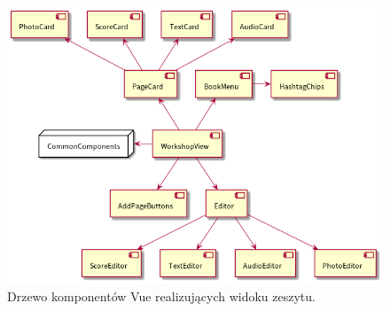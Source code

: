 \begin{figure}[H]
	\begin{center}
		\includegraphics[scale=0.6]{media/WorkshopComponents.png}
	\end{center}
	\caption{Drzewo komponentów Vue realizujących widoku zeszytu.}
	\label{rys:workshop-components}
\end{figure}

